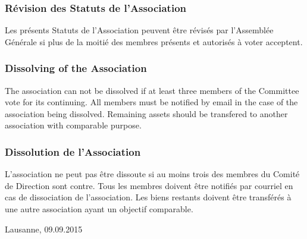 \documentclass[12pt,a4paper,oneside]{article}
\newcounter{art}
\newcommand{\english}{    \switchcolumn[0]\noindent}
\newcommand{\french}{    \switchcolumn[1]\noindent}
\begin{document}
\begin{paracol}{2}
	\french
	\subsubsection{Révision des Statuts de l’Association}\stepcounter{art}
	Les présents Statuts de l’Association peuvent être révisés par l’Assemblée Générale si plus de la moitié des membres présents et autorisés à voter acceptent.


	\english
	\subsubsection{Dissolving of the Association}\stepcounter{art}
	The association can not be dissolved if at least three members of the Committee vote for its continuing.
	All members must be notified by email in the case of the association being dissolved.
	Remaining assets should be transfered to another association with comparable purpose.


	\french
	\subsubsection{Dissolution de l’Association}\stepcounter{art}
	L’association ne peut pas être dissoute si au moins trois des membres du Comité de Direction sont contre. Tous les membres doivent être notifiés par courriel en cas de dissociation de l’association. Les biens restants doivent être transférés à une autre association ayant un objectif comparable.


\english
	\vspace{\fill}
	
	\noindent
	Lausanne, 09.09.2015
	\vspace {1.5cm}

	\noindent
	\hrulefill \\
 
	\vspace {1.0cm}
 	\noindent 
 	\hrulefill \\
 	

 	

	
	

\clearpage

% 



\end{paracol}
\end{document}
